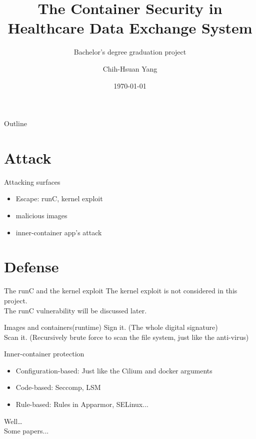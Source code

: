 \documentclass{beamer}
\title{The Container Security in Healthcare Data Exchange System}
\subtitle{Bachelor's degree graduation project}
\author{Chih-Hsuan Yang}
\institute{National Sun Yat-sen University\\
Advisor: Chun-I Fan
}
\date{\today}
\begin{document}
\begin{CJK*}{UTF8}{bsmi}

  \begin{frame}
    \titlepage
  \end{frame}


  \begin{frame}{Outline}
    \begin{multicols}{2}
      \tableofcontents
    \end{multicols}
  \end{frame}

  \section{Attack}
  \begin{frame}{Attacking surfaces}
    \begin{itemize}
      \item Escape: runC, kernel exploit
      \item malicious images
      \item inner-container app's attack
    \end{itemize}
  \end{frame}

  \section{Defense}
  \begin{frame}{The runC and the kernel exploit}
    The kernel exploit is not considered in this project.\\
    The runC vulnerability will be discussed later.
  \end{frame}

  \begin{frame}{Images and containers(runtime)}
    Sign it. (The whole digital signature)\\
    Scan it. (Recursively brute force to scan the file system, just like the anti-virus)
  \end{frame}

  \begin{frame}{Inner-container protection}
    \begin{itemize}
      \item Configuration-based: Just like the Cilium and docker arguments
      \item Code-based: Seccomp, LSM
      \item {\color{green} Rule-based}: Rules in Apparmor, SELinux...
    \end{itemize}
    Well\dots\\
    Some papers... \cite*{217468,269600,Access_Control_Architecture}
  \end{frame}


\end{CJK*}
\end{document}
